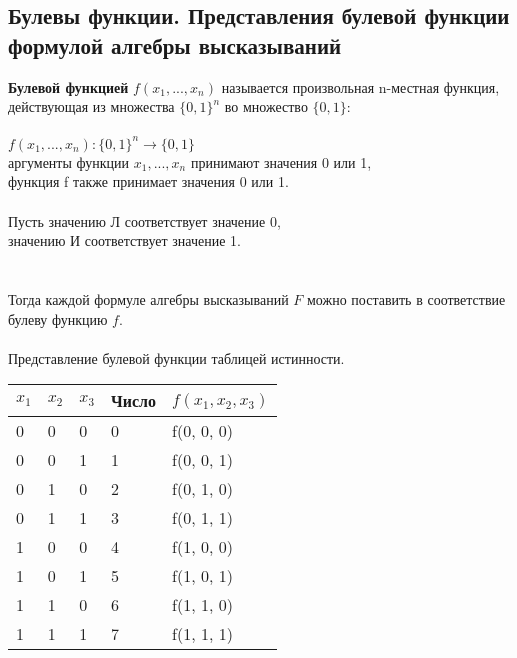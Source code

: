 \documentclass{article}
\begin{document}
	\begin{center}
		\item
		\subsection*{Булевы функции. Представления булевой функции формулой алгебры высказываний}
	\end{center}
	
	\textbf{Булевой функцией} $f (x_1, ..., x_n)$ называется произвольная n-местная функция,
	действующая из множества ${\{0, 1\}}^n$ во множество ${\{0, 1\}}$:
	\\\\
	$f (x_1, ..., x_n): {\{0, 1\}}^n \rightarrow {\{0, 1\}}$\\
	аргументы функции $x_1, ..., x_n$ принимают значения 0 или 1,\\
	функция f также принимает значения 0 или 1.
	\\\\
	Пусть значению Л соответствует значение 0,\\
	значению И соответствует значение 1.\\
	\\\\
	Тогда каждой формуле алгебры высказываний $F$ можно поставить в соответствие
	булеву функцию $f$.
	\\\\
	Представление булевой функции таблицей истинности.

	\begin{table}[ht]
		\begin{tabular}{|l|l|l|l|l|}
			\hline
			\rowcolor[HTML]{D7B1DA} 
			$x_1$ & $x_2$ & $x_3$ & Число & $f(x_1, x_2, x_3)$ \\ \hline
			\rowcolor[HTML]{C8D7A5} 
			0     & 0     & 0     & 0     & f(0, 0, 0)         \\ \hline
			\rowcolor[HTML]{C8D7A5} 
			0     & 0     & 1     & 1     & f(0, 0, 1)         \\ \hline
			\rowcolor[HTML]{C8D7A5} 
			0     & 1     & 0     & 2     & f(0, 1, 0)         \\ \hline
			\rowcolor[HTML]{C8D7A5} 
			0     & 1     & 1     & 3     & f(0, 1, 1)         \\ \hline
			\rowcolor[HTML]{BBDAD5} 
			1     & 0     & 0     & 4     & f(1, 0, 0)         \\ \hline
			\rowcolor[HTML]{BBDAD5} 
			1     & 0     & 1     & 5     & f(1, 0, 1)         \\ \hline
			\rowcolor[HTML]{BBDAD5} 
			1     & 1     & 0     & 6     & f(1, 1, 0)         \\ \hline
			\rowcolor[HTML]{BBDAD5} 
			1     & 1     & 1     & 7     & f(1, 1, 1)         \\ \hline
		\end{tabular}
	\end{table}
	
\end{document}
